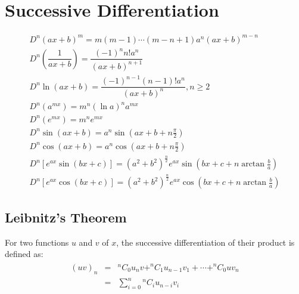 \large{\chapter{Successive Differentiation}}
\begin{align}
	D^n (ax+b)^m=m(m-1)\cdots(m-n+1) a^n (ax+b)^{m-n}\\
	D^n \left(\dfrac{1}{ax+b}\right)=\dfrac{(-1)^n n!a^n}{(ax+b)^{n+1}}\\
	D^n \ln(ax+b)=\dfrac{(-1)^{n-1} (n-1)!a^n}{(ax+b)^n}, n \geq 2\\
	D^n (a^{mx})=m^n (\ln a)^n a^{mx}\\
	D^n (e^{mx})=m^n e^{mx}\\
	D^n \sin (ax+b)=a^n \sin(ax+b+n\frac{\pi}{2})\\
	D^n \cos (ax+b)=a^n \cos(ax+b+n\frac{\pi}{2})\\
	D^n [e^{ax} \sin(bx+c)]=(a^2+b^2)^{\frac{n}{2}} e^{ax} \sin(bx+c+n\arctan\frac{b}{a})\\
	D^n [e^{ax} \cos(bx+c)]=(a^2+b^2)^{\frac{n}{2}} e^{ax} \cos(bx+c+n\arctan\frac{b}{a})
\end{align}

\section{Leibnitz's Theorem}
For two functions $u$ and $v$ of $x$, the successive differentiation of their product is defined as:
\begin{equation}
	\begin{aligned}
		\begin{split}
			(uv)_n & = &^nC_0 u_n v+^nC_1 u_{n-1} v_1+\cdots+^nC_0 u v_n\\
			& = & \sum_{i=0}^n {^nC_i} u_{n-i} v_i
		\end{split}
	\end{aligned}
\end{equation}

